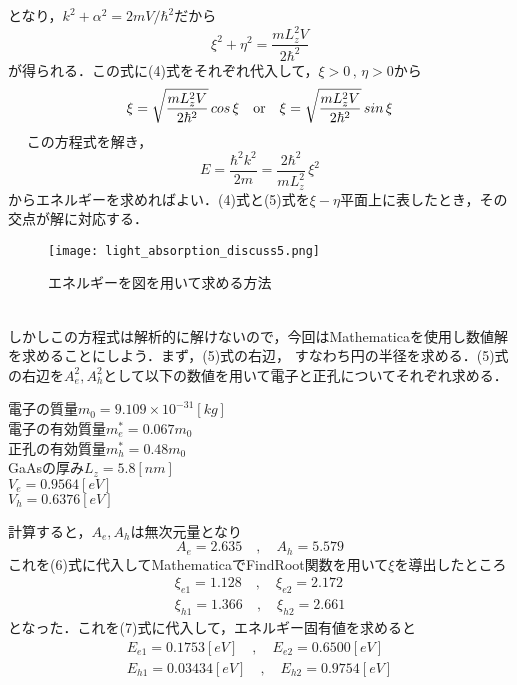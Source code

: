 \documentclass[a4paper,11pt,titlepage]{jsarticle}
\begin{document}
となり，$k^2+\alpha^2 = 2mV/\hbar^2$だから\\
\begin{equation}
    \xi^2 + \eta^2 = \frac{mL_z^2V}{2\hbar^2} %
\end{equation}
が得られる．この式に(4)式をそれぞれ代入して，$\xi > 0\,,\,\eta > 0$から
\begin{equation}
    \xi=\sqrt{\frac{mL_z^2V}{2\hbar^2}}\,cos\,\xi\quad{\rm or}\quad \xi=\sqrt{\frac{mL_z^2V}{2\hbar^2}}\,sin\,\xi
\end{equation}　%
この方程式を解き，
\begin{equation}
    E = \frac{\hbar^2k^2}{2m} = \frac{2\hbar^2}{mL_z^2}\,\xi^2 %
\end{equation}
からエネルギーを求めればよい．(4)式と(5)式を$\xi - \eta$平面上に表したとき，その交点が解に対応する．
\begin{figure}[h]
    \centering
    \texttt{[image: light\_absorption\_discuss5.png]}
    \caption{エネルギーを図を用いて求める方法}
\end{figure}\\
しかしこの方程式は解析的に解けないので，今回はMathematicaを使用し数値解を求めることにしよう．まず，(5)式の右辺，
すなわち円の半径を求める．(5)式の右辺を$A_e^2,A_h^2$として以下の数値を用いて電子と正孔についてそれぞれ求める．
\begin{center}
    電子の質量$m_0=9.109\times 10^{-31}[kg]$\\
    電子の有効質量$m_e^* = 0.067m_0$\\
    正孔の有効質量$m_h^* = 0.48m_0$\\
    GaAsの厚み$L_z = 5.8[nm]$\\
    $V_e = 0.9564[eV]$\\
    $V_h = 0.6376[eV]$
\end{center}
計算すると，$A_e,A_h$は無次元量となり
\begin{equation}
    A_e = 2.635\quad , \quad A_h = 5.579
\end{equation}
これを(6)式に代入してMathematicaでFindRoot関数を用いて$\xi$を導出したところ
\begin{equation}
    \begin{split}
        \xi_{e1} = 1.128\quad , \quad \xi_{e2} = 2.172\\
        \xi_{h1} = 1.366\quad , \quad \xi_{h2} = 2.661
    \end{split}
\end{equation}
となった．これを(7)式に代入して，エネルギー固有値を求めると
\begin{equation}
    \begin{split}
        E_{e1} = 0.1753[eV]\quad , \quad E_{e2} = 0.6500[eV]\\
        E_{h1} = 0.03434[eV]\quad , \quad E_{h2} = 0.9754[eV]
    \end{split}
\end{equation}
\end{document}
